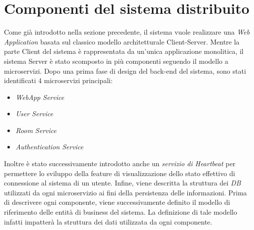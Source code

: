 \section{Componenti del sistema distribuito}
Come già introdotto nella sezione precedente, il sistema vuole realizzare una \textit{Web Application} basata sul classico modello architetturale Client-Server.
Mentre la parte Client del sistema è rappresentata da un'unica applicazione monolitica, il sistema Server è stato scomposto in più componenti seguendo il modello a microservizi.
Dopo una prima fase di design del back-end del sistema, sono stati identificati 4 microservizi principali:
\begin{itemize}
    \item \textit{WebApp Service}
    \item \textit{User Service}
    \item \textit{Room Service}
    \item \textit{Authentication Service}
\end{itemize}
Inoltre è stato successivamente introdotto anche un \textit{servizio di Heartbeat} per permettere lo sviluppo della feature di visualizzazione dello stato effettivo di connessione al sistema di un utente.
Infine, viene descritta la struttura dei \textit{DB} utilizzati da ogni microservizio ai fini della persistenza delle informazioni.
Prima di descrivere ogni componente, viene successivamente definito il modello di riferimento delle entità di business del sistema. La definizione di tale modello infatti impatterà la struttura dei dati utilizzata da ogni componente.

